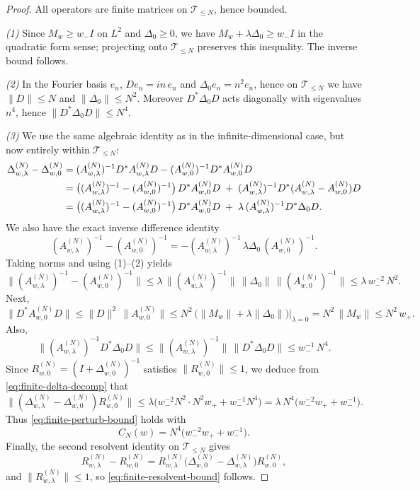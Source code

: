 \documentclass{amsart}
\numberwithin{equation}{section}
\theoremstyle{definition}
\theoremstyle{remark}
\begin{document}
\begin{proof}
All operators are finite matrices on $\mathcal T_{\le N}$, hence bounded.

\smallskip
\noindent\emph{(1)} Since $M_w\ge w_-I$ on $L^2$ and $\Delta_0\ge 0$, we have
$M_w+\lambda\Delta_0\ge w_-I$ in the quadratic form sense; projecting onto $\mathcal T_{\le N}$
preserves this inequality. The inverse bound follows.

\smallskip
\noindent\emph{(2)} In the Fourier basis $e_n$, $De_n=in\,e_n$ and $\Delta_0 e_n=n^2e_n$,
hence on $\mathcal T_{\le N}$ we have $\|D\|\le N$ and $\|\Delta_0\|\le N^2$.
Moreover $D^*\Delta_0D$ acts diagonally with eigenvalues $n^4$, hence $\|D^*\Delta_0D\|\le N^4$.

\smallskip
\noindent\emph{(3)} We use the same algebraic identity as in the infinite-dimensional case,
but now entirely within $\mathcal T_{\le N}$:
\begin{align}
\Delta_{w,\lambda}^{(N)}-\Delta_{w,0}^{(N)}
&=
(A_{w,\lambda}^{(N)})^{-1} D^* A_{w,\lambda}^{(N)} D
-
(A_{w,0}^{(N)})^{-1} D^* A_{w,0}^{(N)} D \notag\\
&=
\big((A_{w,\lambda}^{(N)})^{-1}-(A_{w,0}^{(N)})^{-1}\big)\,D^*A_{w,0}^{(N)}D
\;+\;
(A_{w,\lambda}^{(N)})^{-1}D^*(A_{w,\lambda}^{(N)}-A_{w,0}^{(N)})D \notag\\
&=
\big((A_{w,\lambda}^{(N)})^{-1}-(A_{w,0}^{(N)})^{-1}\big)\,D^*A_{w,0}^{(N)}D
\;+\;
\lambda\,(A_{w,\lambda}^{(N)})^{-1}D^*\Delta_0D.
\label{eq:finite-delta-decomp}
\end{align}
We also have the exact inverse difference identity
\[
(A_{w,\lambda}^{(N)})^{-1}-(A_{w,0}^{(N)})^{-1}
=-(A_{w,\lambda}^{(N)})^{-1}\,\lambda\Delta_0\,(A_{w,0}^{(N)})^{-1}.
\]
Taking norms and using (1)--(2) yields
\[
\|(A_{w,\lambda}^{(N)})^{-1}-(A_{w,0}^{(N)})^{-1}\|
\le
\lambda\,\|(A_{w,\lambda}^{(N)})^{-1}\|\,\|\Delta_0\|\,\|(A_{w,0}^{(N)})^{-1}\|
\le \lambda\,w_-^{-2}\,N^2.
\]
Next,
\[
\|D^*A_{w,0}^{(N)}D\|
\le
\|D\|^2\,\|A_{w,0}^{(N)}\|
\le
N^2\,\big(\|M_w\|+\lambda\|\Delta_0\|\big)\big|_{\lambda=0}
=
N^2\,\|M_w\|
\le N^2\,w_+.
\]
Also,
\[
\|(A_{w,\lambda}^{(N)})^{-1}D^*\Delta_0D\|
\le
\|(A_{w,\lambda}^{(N)})^{-1}\|\,\|D^*\Delta_0D\|
\le w_-^{-1}\,N^4.
\]
Since $R_{w,0}^{(N)}=(I+\Delta_{w,0}^{(N)})^{-1}$ satisfies $\|R_{w,0}^{(N)}\|\le 1$,
we deduce from \eqref{eq:finite-delta-decomp} that
\[
\|(\Delta_{w,\lambda}^{(N)}-\Delta_{w,0}^{(N)})R_{w,0}^{(N)}\|
\le
\lambda\Big( w_-^{-2}N^2\cdot N^2 w_+ + w_-^{-1}N^4 \Big)
=
\lambda\,N^4\Big(w_-^{-2}w_+ + w_-^{-1}\Big).
\]
Thus \eqref{eq:finite-perturb-bound} holds with
\[
C_N(w)=N^4\Big(w_-^{-2}w_+ + w_-^{-1}\Big).
\]
Finally, the second resolvent identity on $\mathcal T_{\le N}$ gives
\[
R_{w,\lambda}^{(N)}-R_{w,0}^{(N)}
=
R_{w,\lambda}^{(N)}\big(\Delta_{w,0}^{(N)}-\Delta_{w,\lambda}^{(N)}\big)R_{w,0}^{(N)},
\]
and $\|R_{w,\lambda}^{(N)}\|\le 1$, so \eqref{eq:finite-resolvent-bound} follows.
\end{proof}
\end{document}
